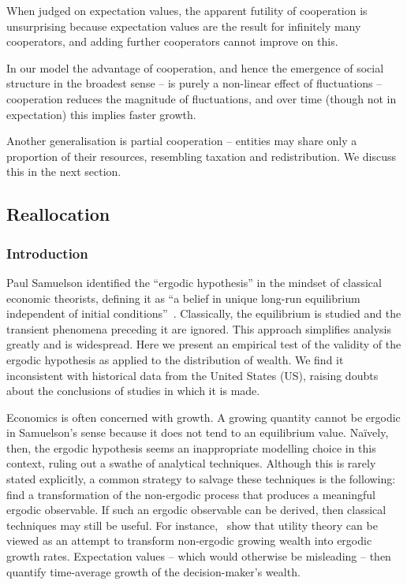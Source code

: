 When judged on expectation values, the apparent futility of cooperation is unsurprising
because expectation values are the result for infinitely 
many cooperators, and adding further cooperators cannot improve on this.

In our model the advantage of cooperation, and hence the emergence
of social structure in the broadest sense -- is purely a non-linear 
effect of fluctuations -- cooperation reduces the magnitude of 
fluctuations, and over time (though not in expectation) this implies faster growth. 


Another generalisation is partial cooperation -- entities may share only
a proportion of their resources, resembling taxation and redistribution. We discuss this in
the next section.
\FloatBarrier

\subsection{Reallocation}\label{reallocation}

\subsubsection{Introduction}\label{sec:introduction}

Paul Samuelson identified the ``ergodic hypothesis'' in the mindset of classical economic theorists, defining it as ``a belief in unique long-run equilibrium independent of initial conditions''~\cite[pp.~11-12]{Samuelson1968}. Classically, the equilibrium is studied and the transient phenomena preceding it are ignored. This approach simplifies analysis greatly and is widespread. Here we present an empirical test of the validity of the ergodic hypothesis as applied to the distribution of wealth. We find it inconsistent with historical data from the United States (US), raising doubts about the conclusions of studies in which it is made.

Economics is often concerned with growth. A growing quantity cannot be ergodic in Samuelson's sense because it does not tend to an equilibrium value. Na\"ively, then, the ergodic hypothesis seems an inappropriate modelling choice in this context, ruling out a swathe of analytical techniques. Although this is rarely stated explicitly, a common strategy to salvage these techniques is the following: find a transformation of the non-ergodic process that produces a meaningful ergodic observable. 
If such an ergodic observable can be derived, then classical techniques may still be useful. For instance,~\cite{PetersGell-Mann2016} show that utility theory can be viewed as an attempt to transform non-ergodic growing wealth into ergodic growth rates. Expectation values -- which would otherwise be misleading -- then quantify time-average growth of the decision-maker's wealth.

